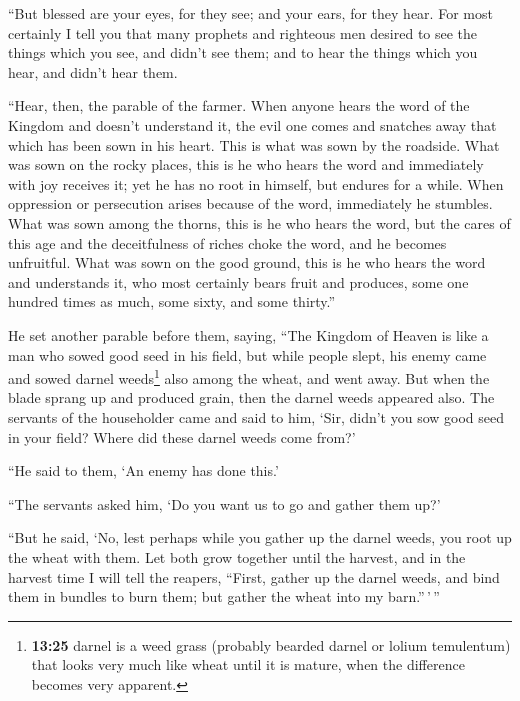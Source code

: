  ``But blessed are your eyes, for they see; and your
ears, for they hear.  For most certainly I tell you that
many prophets and righteous men desired to see the things which you see,
and didn't see them; and to hear the things which you hear, and didn't
hear them.

 ``Hear, then, the parable of the farmer. 
When anyone hears the word of the Kingdom and doesn't understand it, the
evil one comes and snatches away that which has been sown in his heart.
This is what was sown by the roadside.  What was sown on
the rocky places, this is he who hears the word and immediately with joy
receives it;  yet he has no root in himself, but endures
for a while. When oppression or persecution arises because of the word,
immediately he stumbles.  What was sown among the thorns,
this is he who hears the word, but the cares of this age and the
deceitfulness of riches choke the word, and he becomes unfruitful.
 What was sown on the good ground, this is he who hears
the word and understands it, who most certainly bears fruit and
produces, some one hundred times as much, some sixty, and some thirty.''

 He set another parable before them, saying, ``The
Kingdom of Heaven is like a man who sowed good seed in his field,
 but while people slept, his enemy came and sowed darnel
weeds\footnote{\textbf{13:25} darnel is a weed grass (probably bearded
  darnel or lolium temulentum) that looks very much like wheat until it
  is mature, when the difference becomes very apparent.} also among the
wheat, and went away.  But when the blade sprang up and
produced grain, then the darnel weeds appeared also.  The
servants of the householder came and said to him, `Sir, didn't you sow
good seed in your field? Where did these darnel weeds come from?'

 ``He said to them, `An enemy has done this.'

``The servants asked him, `Do you want us to go and gather them up?'

 ``But he said, `No, lest perhaps while you gather up the
darnel weeds, you root up the wheat with them.  Let both
grow together until the harvest, and in the harvest time I will tell the
reapers, ``First, gather up the darnel weeds, and bind them in bundles
to burn them; but gather the wheat into my barn.''\,'\,''

